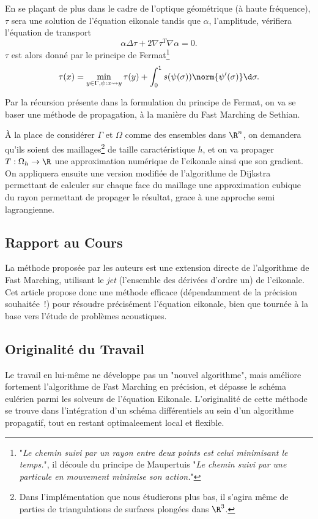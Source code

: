 \documentclass[math, info]{mpb-cours}
\begin{document}
\smallskip

En se plaçant de plus dans le cadre de l'optique géométrique (à haute fréquence), $\tau$ sera une solution
de l'équation eikonale tandis que $\alpha$, l'amplitude, vérifiera l'équation de transport
\begin{equation*}
	\alpha\Delta\tau + 2\nabla\tau^{T}\nabla\alpha = 0.
\end{equation*}
$\tau$ est alors donné par le principe de Fermat\footnote{"\textit{Le chemin suivi par un rayon entre deux
		points est celui minimisant le temps.}", il découle du principe de Maupertuis "\textit{Le chemin suivi
		par une particule en mouvement minimise son action.}"}
\begin{equation*}
	\tau(x) = \min_{y\in \Gamma, \psi: x \rightsquigarrow y} \tau(y) + \int_{0}^{1} s(\psi(\sigma))\norm{\psi'(\sigma)}\d\sigma.
\end{equation*}

Par la récursion présente dans la formulation du principe de Fermat, on va se baser une méthode de
propagation, à la manière du Fast Marching de Sethian.

À la place de considérer $\Gamma$ et $\Omega$ comme des ensembles dans $\R^{n}$, on demandera qu'ils soient
des maillages\footnote{Dans l'implémentation que nous étudierons plus bas, il s'agira même de parties de
	triangulations de surfaces plongées dans $\R^{3}$.} de taille caractéristique $h$, et on va propager
$T : \Omega_{h} \to \R$ une approximation numérique de l'eikonale ainsi que son gradient.
On appliquera ensuite une version modifiée de l'algorithme de Dijkstra permettant de calculer sur chaque
face du maillage une approximation cubique du rayon permettant de propager le résultat, grace à une approche
semi lagrangienne.

\subsection{Rapport au Cours}
La méthode proposée par les auteurs est une extension directe de l'algorithme de Fast Marching,
utilisant le \textit{jet} (l'ensemble des dérivées d'ordre un) de l'eikonale.
Cet article propose donc une méthode efficace (dépendamment de la précision souhaitée~!) pour résoudre
précisément l'équation eikonale, bien que tournée à la base vers l'étude de problèmes acoustiques.

\subsection{Originalité du Travail}
Le travail en lui-même ne développe pas un "nouvel algorithme", mais améliore fortement l'algorithme de
Fast Marching en précision, et dépasse le schéma eulérien parmi les solveurs de l'équation Eikonale.
L'originalité de cette méthode se trouve dans l'intégration d'un schéma différentiels au sein d'un algorithme
propagatif, tout en restant optimaleement local et flexible.
\end{document}
